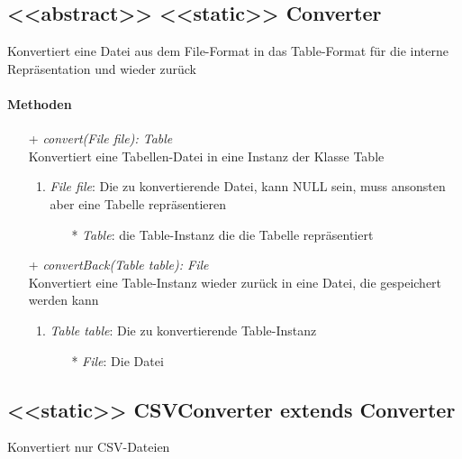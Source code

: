 \subsection{<<abstract>> <<static>> Converter}
Konvertiert eine Datei aus dem File-Format in das Table-Format für die interne Repräsentation und wieder zurück \\

\paragraph{Methoden}

\begin{itemize}
	\item[+] \textit{convert(File file): Table} \\
	Konvertiert eine Tabellen-Datei in eine Instanz der Klasse Table
	\begin{enumerate}
		\item \textit{File file}: Die zu konvertierende Datei, kann NULL sein, muss ansonsten aber eine Tabelle repräsentieren
		\begin{itemize}
			\item[*] \textit{Table}: die Table-Instanz die die Tabelle repräsentiert
		\end{itemize}
	\end{enumerate}

	\item[+] \textit{convertBack(Table table): File} \\
	Konvertiert eine Table-Instanz wieder zurück in eine Datei, die gespeichert werden kann
	\begin{enumerate}
		\item \textit{Table table}: Die zu konvertierende Table-Instanz
		\begin{itemize}
			\item[*] \textit{File}: Die Datei
		\end{itemize}
	\end{enumerate}
\end{itemize}
			
			
\subsection{<<static>> CSVConverter extends Converter}
Konvertiert nur CSV-Dateien \\

